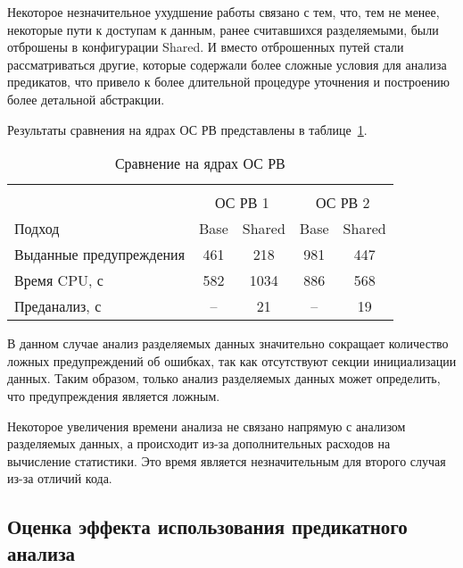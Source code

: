 Некоторое незначительное ухудшение работы связано с тем, что, тем не менее, некоторые пути к доступам к данным, ранее считавшихся разделяемыми, были отброшены в конфигурации Shared.
И вместо отброшенных путей стали рассматриваться другие, которые содержали более сложные условия для анализа предикатов, что привело к более длительной процедуре уточнения и построению более детальной абстракции.

Результаты сравнения на ядрах ОС РВ представлены в таблице~\ref{table-os-shared}.

  \begin{table}[h]\footnotesize \centering
    \caption{Сравнение на ядрах ОС РВ}
  	\label{table-os-shared}
    \begin{tabular}{ | l | c | c | c | c |  }
      \hline
      		& 		\multicolumn{4}{c|}{\combatmode}  \\
      		& 			 \multicolumn{2}{c|}{ОС РВ 1} & 	\multicolumn{2}{c|}{ОС РВ 2}\\
      Подход         					& Base  & Shared  	& Base  & Shared 	\\ \hline
      Выданные предупреждения			& 461   & 218    	& 981   & 447  			\\ 
  	  Время CPU, с 						& 582   & 1034  	& 886   & 568  		\\ 
  	  \hspace{0.5cm} Преданализ, с 		& --   	& 21  		& --   	& 19  		\\ 
      \hline
    \end{tabular}
  \end{table}

В данном случае анализ разделяемых данных значительно сокращает количество ложных предупреждений об ошибках, так как отсутствуют секции инициализации данных.
Таким образом, только анализ разделяемых данных может определить, что предупреждения является ложным.

Некоторое увеличения времени анализа не связано напрямую с анализом разделяемых данных, а происходит из-за дополнительных расходов на вычисление статистики.
Это время является незначительным для второго случая из-за отличий кода.

\subsection{Оценка эффекта использования предикатного анализа}

